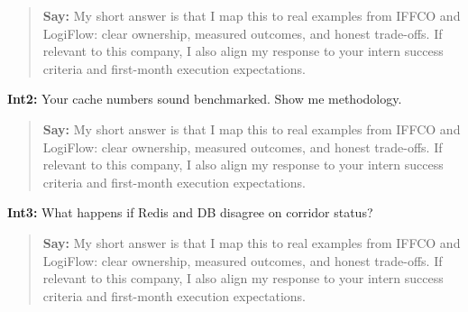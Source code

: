 \documentclass[9pt,a4paper]{article}
\begin{document}
\begin{quote}\small\textbf{Say:} My short answer is that I map this to real examples from IFFCO and LogiFlow: clear ownership, measured outcomes, and honest trade-offs. If relevant to this company, I also align my response to your intern success criteria and first-month execution expectations.\end{quote}
\vspace{2mm}
\textbf{Int2:} Your cache numbers sound benchmarked. Show me methodology.

\begin{quote}\small\textbf{Say:} My short answer is that I map this to real examples from IFFCO and LogiFlow: clear ownership, measured outcomes, and honest trade-offs. If relevant to this company, I also align my response to your intern success criteria and first-month execution expectations.\end{quote}
\vspace{2mm}
\textbf{Int3:} What happens if Redis and DB disagree on corridor status?

\begin{quote}\small\textbf{Say:} My short answer is that I map this to real examples from IFFCO and LogiFlow: clear ownership, measured outcomes, and honest trade-offs. If relevant to this company, I also align my response to your intern success criteria and first-month execution expectations.\end{quote}
\vspace{2mm}
\end{document}
